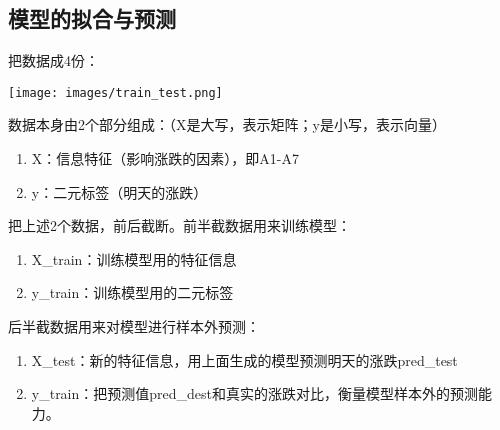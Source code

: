 \documentclass[
  letterpaper,
  DIV=11,
  numbers=noendperiod]{scrreprt}
\providecommand{\tightlist}{%
  \setlength{\itemsep}{0pt}\setlength{\parskip}{0pt}}\usepackage{longtable,booktabs,array}
\begin{document}
\hypertarget{ux6a21ux578bux7684ux62dfux5408ux4e0eux9884ux6d4b}{%
\subsection{模型的拟合与预测}\label{ux6a21ux578bux7684ux62dfux5408ux4e0eux9884ux6d4b}}

把数据成4份：

\texttt{[image: images/train\_test.png]}

数据本身由2个部分组成：（X是大写，表示矩阵；y是小写，表示向量）

\begin{enumerate}
\def\labelenumi{\arabic{enumi}.}
\tightlist
\item
  X：信息特征（影响涨跌的因素），即A1-A7
\item
  y：二元标签（明天的涨跌）
\end{enumerate}

把上述2个数据，前后截断。前半截数据用来训练模型：

\begin{enumerate}
\def\labelenumi{\arabic{enumi}.}
\tightlist
\item
  X\_train：训练模型用的特征信息
\item
  y\_train：训练模型用的二元标签
\end{enumerate}

后半截数据用来对模型进行样本外预测：

\begin{enumerate}
\def\labelenumi{\arabic{enumi}.}
\tightlist
\item
  X\_test：新的特征信息，用上面生成的模型预测明天的涨跌pred\_test
\item
  y\_train：把预测值pred\_dest和真实的涨跌对比，衡量模型样本外的预测能力。
\end{enumerate}
\end{document}
